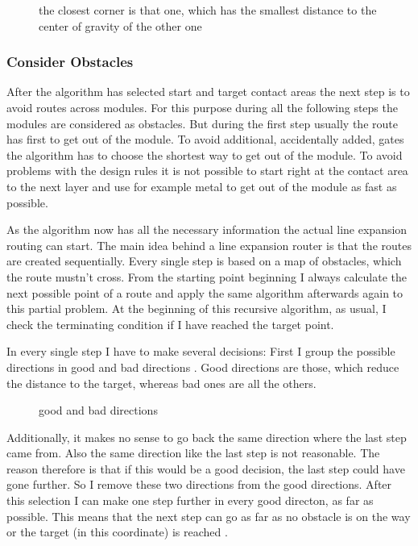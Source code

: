 \begin{figure}
	\centering
	
  	\caption{the closest corner is that one, which has the smallest distance to the center of gravity of the other one}
	\label{fig:rectangles_closest_corner}
\end{figure}

\subsubsection{Consider Obstacles}
After the algorithm has selected start and target contact areas the next step is to avoid routes across modules. For this purpose during all the following steps the modules are considered as obstacles. But during the first step usually the route has first to get out of the module. To avoid additional, accidentally added, gates the algorithm has to choose the shortest way to get out of the module. To avoid problems with the design rules it is not possible to start right at the contact area to the next layer and use for example metal to get out of the module as fast as possible.

As the algorithm now has all the necessary information the actual line expansion routing can start. The main idea behind a line expansion router is that the routes are created sequentially. Every single step is based on a map of obstacles, which the route mustn't cross. From the starting point beginning I always calculate the next possible point of a route and apply the same algorithm afterwards again to this partial problem. At the beginning of this recursive algorithm, as usual, I check the terminating condition if I have reached the target point.

In every single step I have to make several decisions: First I group the possible directions in good and bad directions . Good directions are those, which reduce the distance to the target, whereas bad ones are all the others.

\begin{figure}
	\centering
	
  	\caption{good and bad directions}
	\label{fig:router_good_bad_direction}
\end{figure}

Additionally, it makes no sense to go back the same direction where the last step came from. Also the same direction like the last step is not reasonable. The reason therefore is that if this would be a good decision, the last step could have gone further. So I remove these two directions from the good directions. After this selection I can make one step further in every good directon, as far as possible. This means that the next step can go as far as no obstacle is on the way or the target (in this coordinate) is reached .

